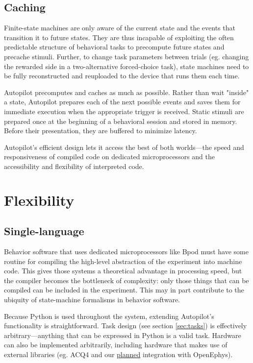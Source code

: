 \documentclass[nohyper, justified, notitlepage, marginals=raggedright,twoside=false,debug]{tufte-autopilot}
\begin{document}
\subsection{Caching}

Finite-state machines are only aware of the current state and the events that transition it to future states. They are thus incapable of exploiting the often predictable structure of behavioral tasks to precompute future states and precache stimuli. Further, to change task parameters between trials (eg. changing the rewarded side in a two-alternative forced-choice task), state machines need to be fully reconstructed and reuploaded to the device that runs them each time.

Autopilot precomputes and caches as much as possible. Rather than wait "inside" a state, Autopilot prepares each of the next possible events and saves them for immediate execution when the appropriate trigger is received. Static stimuli are prepared once at the beginning of a behavioral session and stored in memory. Before their presentation, they are buffered to minimize latency.

\vspace{16pt}

Autopilot's efficient design lets it access the best of both worlds---the speed and responsiveness of compiled code on dedicated microprocessors and the accessibility and flexibility of interpreted code.

\clearpage

\section{Flexibility}
\label{sec:flexibility}

\subsection{Single-language}
\label{sec:singlelanguage}

Behavior software that uses dedicated microprocessors like Bpod must have some routine for compiling the high-level abstraction of the experiment into machine code. This gives those systems a theoretical advantage in processing speed, but the compiler becomes the bottleneck of complexity: only those things that can be compiled can be included in the experiment. This may in part contribute to the ubiquity of state-machine formalisms in behavior software.

Because Python is used throughout the system, extending Autopilot's functionality is straightforward. Task design (see section \hyperref[sec:tasks]{\ref*{sec:tasks}}) is effectively arbitrary---anything that can be expressed in Python is a valid task. Hardware can also be implemented arbitrarily, including hardware that makes use of external libraries (eg. ACQ4\citep{campagnolaACQ4OpensourceSoftware2014} and our \hyperref[item:othertools]{planned} integration with OpenEphys).
\end{document}
